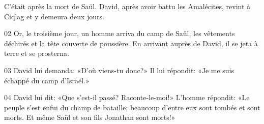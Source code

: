 C’était après la mort de Saül. David, après avoir battu les Amalécites, revint à Ciqlag et y demeura deux jours.

02 Or, le troisième jour, un homme arriva du camp de Saül, les vêtements déchirés et la tête couverte de poussière. En arrivant auprès de David, il se jeta à terre et se prosterna.

03 David lui demanda: «D’où viens-tu donc?» Il lui répondit: «Je me suis échappé du camp d’Israël.»

04 David lui dit: «Que s’est-il passé? Raconte-le-moi!» L’homme répondit: «Le peuple s’est enfui du champ de bataille; beaucoup d’entre eux sont tombés et sont morts. Et même Saül et son fils Jonathan sont morts!»

